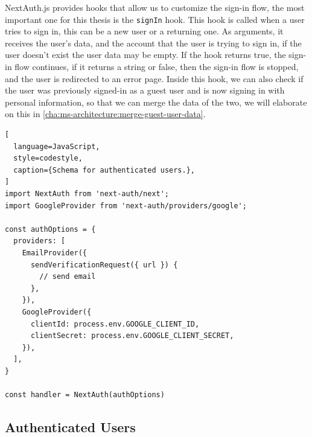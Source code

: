 NextAuth.js provides hooks that allow us to customize the sign-in flow, the most important
one for this thesis is the \lstinline{signIn} hook.
This hook is called when a user tries to sign in, this can be a new user or a returning
one.
As arguments, it receives the user's data, and the account that the user is trying to sign
in, if the user doesn't exist the user data may be empty.
If the hook returns true, the sign-in flow continues, if it returns a string or false,
then the sign-in flow is stopped, and the user is redirected to an error page.
Inside this hook, we can also check if the user was previously signed-in as a guest user
and is now signing in with personal information, so that we can merge the data of the two,
we will elaborate on this in \ref{cha:ms-architecture:merge-guest-user-data}.


\begin{lstlisting}[
  language=JavaScript,
  style=codestyle,
  caption={Schema for authenticated users.},
]
import NextAuth from 'next-auth/next';
import GoogleProvider from 'next-auth/providers/google';

const authOptions = {
  providers: [
    EmailProvider({
      sendVerificationRequest({ url }) {
        // send email
      },
    }),
    GoogleProvider({
      clientId: process.env.GOOGLE_CLIENT_ID,
      clientSecret: process.env.GOOGLE_CLIENT_SECRET,
    }),
  ],
}

const handler = NextAuth(authOptions)
\end{lstlisting}


%
%


\subsection{Authenticated Users}
\label{cha:ms-architecture:authenticated-users}


